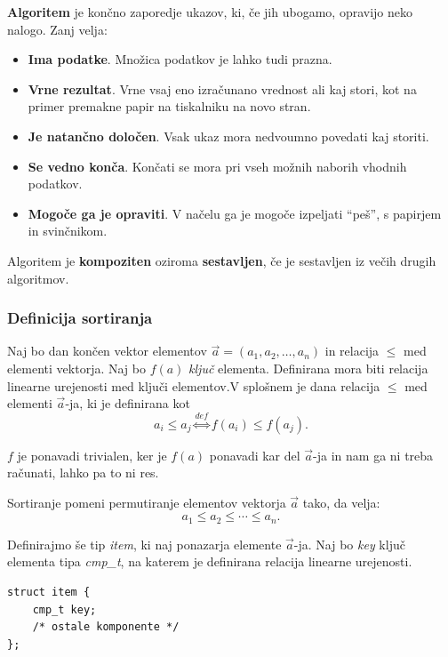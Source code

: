 \documentclass[a4paper,oneside]{article}
\begin{document}
\textbf{Algoritem} je končno zaporedje ukazov, ki, če jih ubogamo, opravijo neko nalogo.
Zanj velja:
\begin{itemize}
  \item \textbf{Ima podatke}. Množica podatkov je lahko tudi prazna.
  \item \textbf{Vrne rezultat}. Vrne vsaj eno izračunano vrednost ali kaj stori, kot na primer
    premakne papir na tiskalniku na novo stran.
  \item \textbf{Je natančno določen}. Vsak ukaz mora nedvoumno povedati kaj storiti.
  \item \textbf{Se vedno konča}. Končati se mora pri vseh možnih naborih vhodnih podatkov.
  \item \textbf{Mogoče ga je opraviti}. V načelu ga je mogoče izpeljati ``peš'', s papirjem in
    svinčnikom.
\end{itemize}

\begin{definicija}
  Algoritem je \textbf{kompoziten} oziroma \textbf{sestavljen}, če je sestavljen iz večih
  drugih algoritmov.
\end{definicija}


\subsubsection{Definicija sortiranja}
Naj bo dan končen vektor elementov $\vec{a} = \left(a_1, a_2, \ldots, a_n \right)$ in
relacija $\leq$ med elementi vektorja.
Naj bo $f(a)$ \emph{ključ} elementa. Definirana mora biti relacija linearne urejenosti med 
ključi elementov.V splošnem je dana relacija $\leq$ med elementi $\vec{a}$-ja, ki je definirana kot 
\[a_i \leq a_j \overset{def}{\Longleftrightarrow} f(a_i) \leq f(a_j). \]

$f$ je ponavadi trivialen, ker je $f(a)$ ponavadi kar del $\vec{a}$-ja in nam ga ni treba
računati, lahko pa to ni res. 

Sortiranje pomeni permutiranje elementov vektorja $\vec{a}$ tako, da velja:
\[ a_1 \leq a_2 \leq \cdots \leq a_n.\]

Definirajmo še tip \emph{item}, ki naj ponazarja elemente $\vec{a}$-ja. Naj bo \emph{key}
ključ elementa tipa \emph{cmp\_t}, na katerem je definirana relacija linearne urejenosti.

\begin{lstlisting}
struct item {
    cmp_t key;
    /* ostale komponente */
};
\end{lstlisting}
\end{document}
